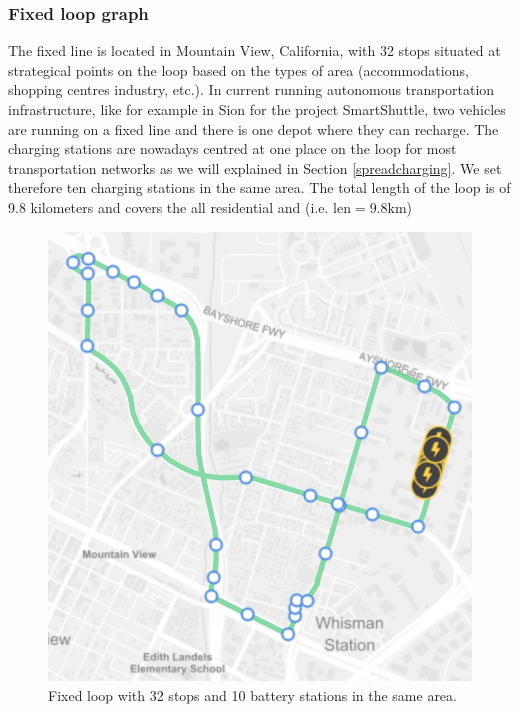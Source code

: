 \documentclass[12pt,a4paper]{article}
\begin{document}
\subsubsection{Fixed loop graph}
The fixed line is located in Mountain View, California, with 32 stops situated at strategical points on the loop based on the types of area (accommodations, shopping centres industry, etc.). In current running autonomous transportation infrastructure, like for example in Sion for the project SmartShuttle, two vehicles are running on a fixed line and there is one depot where they can recharge. The charging stations are nowadays centred at one place on the loop for most transportation networks as we will explained in Section \ref{spreadcharging}. We set therefore ten charging stations in the same area. The total length of the loop is of 9.8 kilometers and covers the all residential and  (i.e. $\text{len} = 9.8\text{km}$)

\begin{figure}
  \centering
\includegraphics[scale=0.5]{./images/graph}
\caption{Fixed loop with 32 stops and 10 battery stations in the same area.}
\label{graph}
\end{figure}
\end{document}
